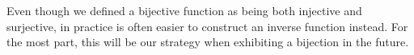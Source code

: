 \documentclass[../notes.tex]{subfiles}
\begin{document}
\begin{remark}
    Even though we defined a bijective function as being both injective and surjective, in practice is often easier to construct an inverse function instead. For the most part, this will be our strategy when exhibiting a bijection in the future.
\end{remark}
\end{document}
